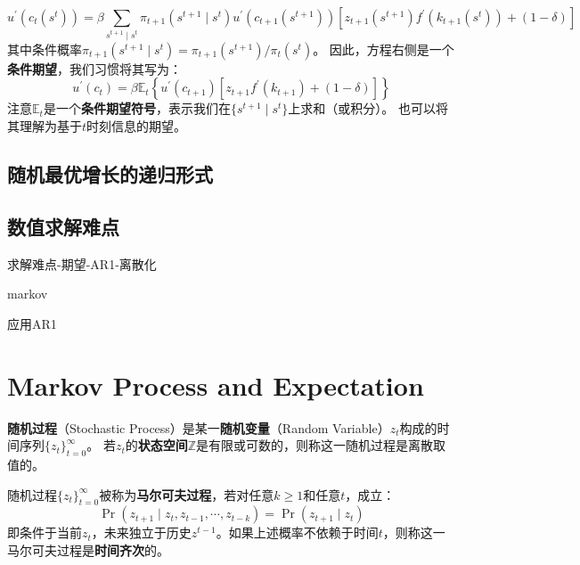 \begin{equation}    \label{eq-sngm-euler1}
    u^{\prime}\left(c_t\left(s^t\right)\right) = 
        \beta\sum_{s^{t+1}\mid s^t} \pi_{t+1}\left(s^{t+1}\mid s^t\right) u^{\prime}\left(c_{t+1}\left(s^{t+1}\right)\right)
            \left[z_{t+1}\left(s^{t+1}\right) f^{\prime}\left(k_{t+1}\left(s^t\right)\right)+\left(1-\delta\right)\right] 
\end{equation}
其中条件概率$\pi_{t+1}\left(s^{t+1}\mid s^t\right) =\pi_{t+1}\left(s^{t+1}\right)/\pi_t\left(s^t\right)$。
因此，方程右侧是一个\textbf{条件期望}，我们习惯将其写为：
\begin{equation}    \label{eq-sngm-euler2}
    u^{\prime}\left(c_t\right) = 
        \beta\mathbb{E}_t\left\{u^{\prime}\left(c_{t+1}\right)
            \left[z_{t+1} f^{\prime}\left(k_{t+1}\right) + \left(1-\delta\right)\right]\right\}
\end{equation}
注意$\mathbb{E}_t$是一个\textbf{条件期望符号}，表示我们在$\{s^{t+1}\mid s^t\}$上求和（或积分）。
也可以将其理解为基于$t$时刻信息的期望。


\subsection{随机最优增长的递归形式}



\subsection{数值求解难点}
求解难点-期望-AR1-离散化

markov

应用AR1



\section{Markov Process and Expectation}

\begin{definition}
    \textbf{随机过程}（Stochastic Process）是某一\textbf{随机变量}（Random Variable）$z_t$构成的时间序列$\{z_t\}_{t=0}^{\infty}$。
    若$z_t$的\textbf{状态空间}$\mathbb{Z}$是有限或可数的，则称这一随机过程是离散取值的。
\end{definition}

\begin{definition}
    随机过程$\{z_t\}_{t=0}^{\infty}$被称为\textbf{马尔可夫过程}，若对任意$k\geq1$和任意$t$，成立：
    \begin{equation*}
        \operatorname{Pr}\left(z_{t+1}\mid z_t,z_{t-1},\cdots,z_{t-k}\right)=\operatorname{Pr}\left(z_{t+1}\mid z_t\right)
    \end{equation*}
    即条件于当前$z_t$，未来独立于历史$z^{t-1}$。如果上述概率不依赖于时间$t$，则称这一马尔可夫过程是\textbf{时间齐次}的。
\end{definition}

